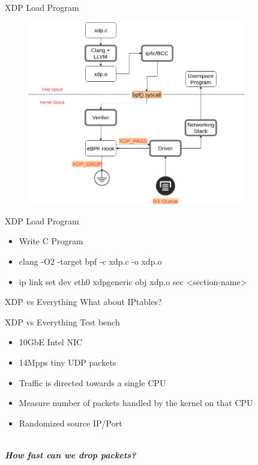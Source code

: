 \documentclass{beamer}
\begin{document}
\begin{frame}{XDP Load Program}
  \begin{figure}
    \includegraphics[width=0.85\textwidth]{./xdp_workflow.png}
  \end{figure}
\end{frame}

\begin{frame}{XDP Load Program}
  \begin{itemize}
    \item Write C Program
    \item clang -O2 -target bpf -c xdp.c -o xdp.o
    \item ip link set dev eth0 xdpgeneric obj xdp.o sec <section-name>
  \end{itemize}
\end{frame}

\begin{frame}{XDP vs Everything}
  \Large{What about IPtables?}
\end{frame}

\begin{frame}{XDP vs Everything}
  Test bench
  \begin{itemize}
    \item 10GbE Intel NIC
    \item 14Mpps tiny UDP packets 
    \item Traffic is directed towards a single CPU
    \item Measure number of packets handled by the kernel on that CPU
    \item Randomized source IP/Port
  \end{itemize}

  \ \\
  \pause
  \textbf{\textit{How fast can we drop packets?}}
\end{frame}
\end{document}
